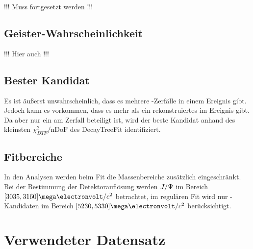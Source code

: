 !!! Muss fortgesetzt werden !!!


\subsection{Geister-Wahrscheinlichkeit}

!!! Hier auch !!!

\subsection{Bester Kandidat}
Es ist äußerst unwahrscheinlich, dass es mehrere \Decaychannel-Zerfälle in einem Ereignis gibt. Jedoch kann es vorkommen, dass es mehr als ein rekonstruiertes \Bd im Ereignis gibt. Da aber nur ein \Bd am Zerfall beteiligt ist, wird der beste Kandidat anhand des kleinsten $\chi^2_{DTF}/\text{nDoF}$ des DecayTreeFit identifiziert. \cite{lhcb-paper}

\subsection{Fitbereiche}
In den Analysen werden beim Fit die Massenbereiche zusätzlich eingeschränkt. Bei der Bestimmung der Detektorauflösung werden $J/\Psi$ im Bereich $[3035, 3160]\mega\electronvolt/c^2$ betrachtet, im regulären Fit wird nur \Bd-Kandidaten im Bereich $[5230, 5330]\mega\electronvolt/c^2$ berücksichtigt.

\section{Verwendeter Datensatz}
